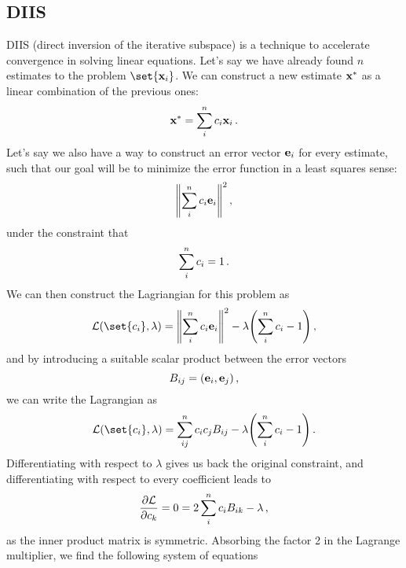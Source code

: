     \subsection{DIIS}
        DIIS \cite{Pulay1980} (direct inversion of the iterative subspace) is a technique to accelerate convergence in solving linear equations. Let's say we have already found $n$ estimates to the problem $\set{\vb{x}_i}$. We can construct a new estimate $\vb{x}^*$ as a linear combination of the previous ones:
        \begin{equation} \label{eq:DIIS_linear_combination}
            \vb{x}^* = \sum_i^n c_i \vb{x}_i \thinspace .
        \end{equation}
        Let's say we also have a way to construct an error vector $\vb{e}_i$ for every estimate, such that our goal will be to minimize the error function in a least squares sense:
        \begin{equation}
            \norm{\sum_i^n c_i \vb{e}_i}^2 \thinspace ,
        \end{equation}
        under the constraint that
        \begin{equation}
            \sum_i^n c_i = 1 \thinspace .
        \end{equation}
        We can then construct the Lagriangian for this problem as
        \begin{equation}
            \mathcal{L}(\set{c_i}, \lambda) = \norm{\sum_i^n c_i \vb{e}_i}^2 - \lambda \qty( \sum_i^n c_i - 1 ) \thinspace ,
        \end{equation}
        and by introducing a suitable scalar product between the error vectors
        \begin{equation}
            B_{ij} = (\vb{e}_i, \vb{e}_j) \thinspace ,
        \end{equation}
        we can write the Lagrangian as
        \begin{equation}
            \mathcal{L}(\set{c_i}, \lambda) = \sum_{ij}^n c_i c_j B_{ij} - \lambda \qty(\sum_i^n c_i - 1) \thinspace .
        \end{equation}
        Differentiating with respect to $\lambda$ gives us back the original constraint, and differentiating with respect to every coefficient leads to
        \begin{equation}
            \pdv{\mathcal{L}}{c_k} = 0 = 2 \sum_i^n c_i B_{ik} - \lambda \thinspace ,
        \end{equation}
        as the inner product matrix is symmetric. Absorbing the factor 2 in the Lagrange multiplier, we find the following system of equations
